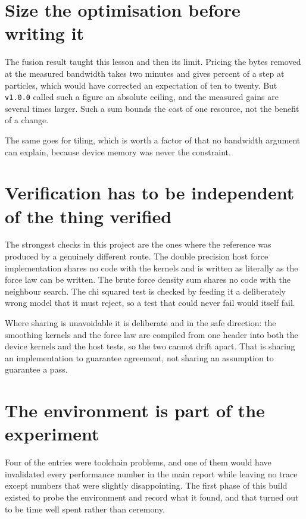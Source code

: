 \section{Size the optimisation before writing it}

The fusion result taught this lesson and then its limit. Pricing the bytes removed at the
measured bandwidth takes two minutes and gives \ModelSavingPercentAtMaxN{} percent of a step at
\LadderMaxN{} particles, which would have corrected an expectation of ten to twenty. But
\texttt{v1.0.0} called such a figure an absolute ceiling, and the measured gains are several times
larger. Such a sum bounds the cost of one resource, not the benefit of a change.

The same goes for tiling, which is worth a factor of \TilingSpeedupAtMaxN{} that no bandwidth
argument can explain, because device memory was never the constraint.

\section{Verification has to be independent of the thing verified}

The strongest checks in this project are the ones where the reference was
produced by a genuinely different route. The double precision host force
implementation shares no code with the kernels and is written as literally as
the force law can be written. The brute force density sum shares no code with
the neighbour search. The chi squared test is checked by feeding it a
deliberately wrong model that it must reject, so a test that could never fail
would itself fail.

Where sharing is unavoidable it is deliberate and in the safe direction: the
smoothing kernels and the force law are compiled from one header into both the
device kernels and the host tests, so the two cannot drift apart. That is
sharing an implementation to guarantee agreement, not sharing an assumption to
guarantee a pass.

\section{The environment is part of the experiment}

Four of the \DebugEntryCount{} entries were toolchain problems, and one of them would have
invalidated every performance number in the main report while leaving no trace
except numbers that were slightly disappointing. The first phase of this build existed
to probe the environment and record what it found, and that turned out to be
time well spent rather than ceremony.

